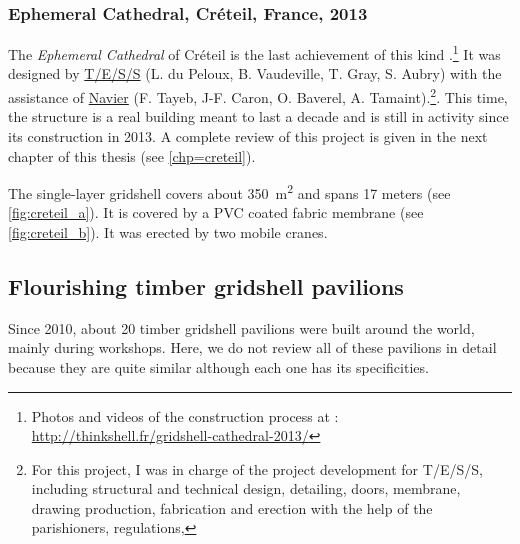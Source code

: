 \subsubsection{Ephemeral Cathedral, Créteil, France, 2013}
The \emph{Ephemeral Cathedral} of Créteil is the last achievement of this kind \cite{DuPeloux2016}.\footnote{Photos and videos of the construction process at : \url{http://thinkshell.fr/gridshell-cathedral-2013/}} It was designed by \href{http://www.tess.fr}{T/E/S/S} (L. du Peloux, B. Vaudeville, T. Gray, S. Aubry) with the assistance of \href{http://navier.enpc.fr}{Navier} (F. Tayeb, J-F. Caron, O. Baverel, A. Tamaint).\footnote{For this project, I was in charge of the project development for T/E/S/S, including structural and technical design, detailing, doors, membrane, drawing production, fabrication and erection with the help of the parishioners, regulations, \telp{}}. This time, the structure is a real building meant to last a decade and is still in activity since its construction in 2013. A complete review of this project is given in the next chapter of this thesis (see \cref{chp=creteil}).

The single-layer gridshell covers about \SI{350}{m^2} and spans 17 meters (see \cref{fig:creteil_a}). It is covered by a PVC coated fabric membrane (see \cref{fig:creteil_b}). It was erected by two mobile cranes.


\subsection{Flourishing timber gridshell pavilions}
Since 2010, about 20 timber gridshell pavilions were built around the world, mainly during workshops. Here, we do not review all of these pavilions in detail because they are quite similar although each one has its specificities.


